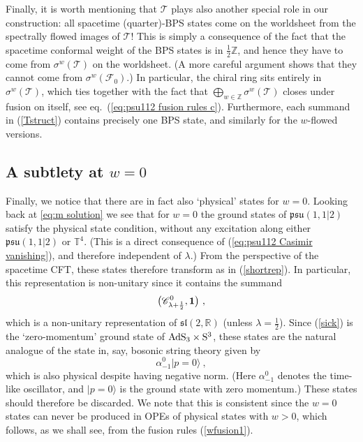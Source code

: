 \documentclass[12pt,a4paper]{article}
\newcommand{\be}{\begin{equation}}
\newcommand{\ee}{\end{equation}}
\begin{document}
Finally, it is worth mentioning that $\mathscr{T}$ plays also another special role in our construction: all spacetime (quarter)-BPS states come on the worldsheet from the spectrally flowed images of $\mathscr{T}$! This is simply a consequence of the fact that the spacetime conformal weight of the BPS states is in $\tfrac{1}{2}\mathds{Z}$, and hence they have to come from $\sigma^w(\mathscr{T})$ on the worldsheet. (A more careful argument shows that they cannot come from $\sigma^w(\mathscr{F}_0)$.) In particular, the chiral ring sits entirely in $\sigma^w(\mathscr{T})$, which ties together with the fact that $\bigoplus_{w \in \mathds{Z}}\sigma^w(\mathscr{T})$ closes under fusion on itself, see eq.~(\ref{eq:psu112 fusion rules c}). Furthermore, each summand in (\ref{Tstruct}) contains precisely one BPS state, and similarly for the $w$-flowed versions.

\subsection{A subtlety at $w=0$}

Finally, we notice that there are in fact also `physical' states for $w=0$. Looking back at \eqref{eq:m solution} we see that for $w=0$ the ground states of $\mathfrak{psu}(1,1|2)$ satisfy the physical state condition, without any excitation along either $\mathfrak{psu}(1,1|2)$ or $\mathbb{T}^4$. (This is a direct consequence of (\ref{eq:psu112 Casimir vanishing}), and therefore independent of $\lambda$.)  From the perspective of the spacetime CFT, these states therefore transform as in (\ref{shortrep}). In particular, this representation is non-unitary since it contains the summand 
\be\label{sick} 
\bigl( \mathscr{C}^{0}_{\lambda+\frac{1}{2}} ,{\bf 1} \bigr) \ , 
\ee
which is a non-unitary representation of $\mathfrak{sl}(2,\mathds{R})$ (unless $\lambda=\frac{1}{2}$). Since (\ref{sick}) is the `zero-momentum' ground state of ${\rm AdS}_3 \times {\rm S}^3$, these states are the natural analogue of the state in, say, bosonic string theory given by 
\be
\alpha^0_{-1} |p=0\rangle \ , 
\ee
which is also physical despite having negative norm. (Here $\alpha^0_{-1}$ denotes the time-like oscillator, and $|p=0\rangle$ is the ground state with zero momentum.) These states should therefore be discarded. We note that this is consistent since the $w=0$ states can never be produced in OPEs of physical states with $w>0$, which follows, as we shall see, from the fusion rules (\ref{wfusion1}).
\end{document}

